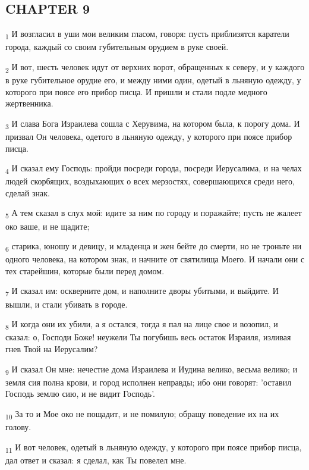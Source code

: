 \subsection{CHAPTER 9}
\begin{tcolorbox}
\textsubscript{1} И возгласил в уши мои великим гласом, говоря: пусть приблизятся каратели города, каждый со своим губительным орудием в руке своей.
\end{tcolorbox}
\begin{tcolorbox}
\textsubscript{2} И вот, шесть человек идут от верхних ворот, обращенных к северу, и у каждого в руке губительное орудие его, и между ними один, одетый в льняную одежду, у которого при поясе его прибор писца. И пришли и стали подле медного жертвенника.
\end{tcolorbox}
\begin{tcolorbox}
\textsubscript{3} И слава Бога Израилева сошла с Херувима, на котором была, к порогу дома. И призвал Он человека, одетого в льняную одежду, у которого при поясе прибор писца.
\end{tcolorbox}
\begin{tcolorbox}
\textsubscript{4} И сказал ему Господь: пройди посреди города, посреди Иерусалима, и на челах людей скорбящих, воздыхающих о всех мерзостях, совершающихся среди него, сделай знак.
\end{tcolorbox}
\begin{tcolorbox}
\textsubscript{5} А тем сказал в слух мой: идите за ним по городу и поражайте; пусть не жалеет око ваше, и не щадите;
\end{tcolorbox}
\begin{tcolorbox}
\textsubscript{6} старика, юношу и девицу, и младенца и жен бейте до смерти, но не троньте ни одного человека, на котором знак, и начните от святилища Моего. И начали они с тех старейшин, которые были перед домом.
\end{tcolorbox}
\begin{tcolorbox}
\textsubscript{7} И сказал им: оскверните дом, и наполните дворы убитыми, и выйдите. И вышли, и стали убивать в городе.
\end{tcolorbox}
\begin{tcolorbox}
\textsubscript{8} И когда они их убили, а я остался, тогда я пал на лице свое и возопил, и сказал: о, Господи Боже! неужели Ты погубишь весь остаток Израиля, изливая гнев Твой на Иерусалим?
\end{tcolorbox}
\begin{tcolorbox}
\textsubscript{9} И сказал Он мне: нечестие дома Израилева и Иудина велико, весьма велико; и земля сия полна крови, и город исполнен неправды; ибо они говорят: 'оставил Господь землю сию, и не видит Господь'.
\end{tcolorbox}
\begin{tcolorbox}
\textsubscript{10} За то и Мое око не пощадит, и не помилую; обращу поведение их на их голову.
\end{tcolorbox}
\begin{tcolorbox}
\textsubscript{11} И вот человек, одетый в льняную одежду, у которого при поясе прибор писца, дал ответ и сказал: я сделал, как Ты повелел мне.
\end{tcolorbox}
